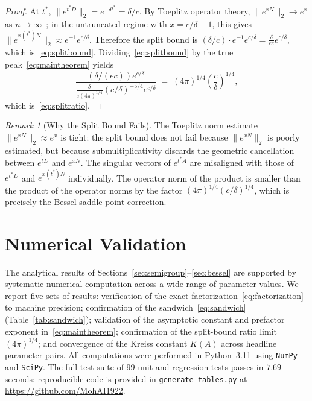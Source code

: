 \documentclass[11pt,reqno]{article}
\theoremstyle{plain}
\theoremstyle{definition}
\theoremstyle{remark}
\newtheorem{remark}[theorem]{Remark}
\numberwithin{equation}{section}
\begin{document}
\begin{proof}
At $t^*$, $\|e^{t^*D}\|_2 = e^{-\delta t^*} = \delta/c$. By Toeplitz operator theory, $\|e^{xN}\|_2 \to e^x$ as $n \to \infty$~\cite{Bottcher2006,Trefethen2005}; in the untruncated regime with $x = c/\delta - 1$, this gives $\|e^{x(t^*)N}\|_2 \approx e^{-1}e^{c/\delta}$. Therefore the split bound is $(\delta/c) \cdot e^{-1}e^{c/\delta} = \frac{\delta}{ec}e^{c/\delta}$, which is~\eqref{eq:splitbound}. Dividing~\eqref{eq:splitbound} by the true peak~\eqref{eq:maintheorem} yields
\[
  \frac{(\delta/(ec))e^{c/\delta}}{\frac{\delta}{e(4\pi)^{1/4}}(c/\delta)^{-5/4}e^{c/\delta}} \;=\; (4\pi)^{1/4} \left(\frac{c}{\delta}\right)^{1/4},
\]
which is~\eqref{eq:splitratio}.
\end{proof}

\begin{remark}[Why the Split Bound Fails]\label{rem:splitfailure}
The Toeplitz norm estimate $\|e^{xN}\|_2 \approx e^x$ is tight: the split bound does not fail because $\|e^{xN}\|_2$ is poorly estimated, but because submultiplicativity discards the geometric cancellation between $e^{tD}$ and $e^{xN}$. The singular vectors of $e^{t^*A}$ are misaligned with those of $e^{t^*D}$ and $e^{x(t^*)N}$ individually. The operator norm of the product is smaller than the product of the operator norms by the factor $(4\pi)^{1/4}(c/\delta)^{1/4}$, which is precisely the Bessel saddle-point correction.
\end{remark}

\section{Numerical Validation}\label{sec:numerics}

The analytical results of Sections~\ref{sec:semigroup}--\ref{sec:bessel} are supported by systematic numerical computation across a wide range of parameter values. We report five sets of results: verification of the exact factorization~\eqref{eq:factorization} to machine precision; confirmation of the sandwich~\eqref{eq:sandwich} (Table~\ref{tab:sandwich}); validation of the asymptotic constant and prefactor exponent in~\eqref{eq:maintheorem}; confirmation of the split-bound ratio limit $(4\pi)^{1/4}$; and convergence of the Kreiss constant $K(A)$ across headline parameter pairs. All computations were performed in Python~3.11 using \texttt{NumPy} and \texttt{SciPy}. The full test suite of 99 unit and regression tests passes in $7.69$ seconds; reproducible code is provided in \texttt{generate\_tables.py} at \url{https://github.com/MohAI1922}.
\end{document}
